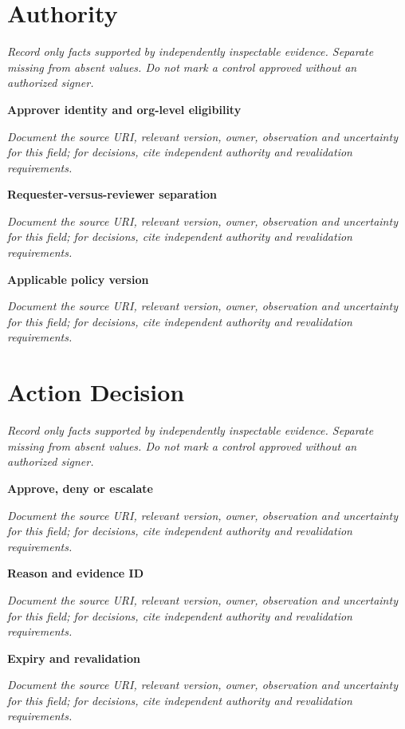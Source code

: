 \documentclass[11pt,letterpaper]{article}
\begin{document}
\section{Authority}
\noindent\emph{Record only facts supported by independently inspectable evidence. Separate missing from absent values. Do not mark a control approved without an authorized signer.}\par
\noindent\textbf{Approver identity and org-level eligibility}\par
\noindent\emph{Document the source URI, relevant version, owner, observation and uncertainty for this field; for decisions, cite independent authority and revalidation requirements.}\par\medskip
\noindent\textbf{Requester-versus-reviewer separation}\par
\noindent\emph{Document the source URI, relevant version, owner, observation and uncertainty for this field; for decisions, cite independent authority and revalidation requirements.}\par\medskip
\noindent\textbf{Applicable policy version}\par
\noindent\emph{Document the source URI, relevant version, owner, observation and uncertainty for this field; for decisions, cite independent authority and revalidation requirements.}\par\medskip
\section{Action Decision}
\noindent\emph{Record only facts supported by independently inspectable evidence. Separate missing from absent values. Do not mark a control approved without an authorized signer.}\par
\noindent\textbf{Approve, deny or escalate}\par
\noindent\emph{Document the source URI, relevant version, owner, observation and uncertainty for this field; for decisions, cite independent authority and revalidation requirements.}\par\medskip
\noindent\textbf{Reason and evidence ID}\par
\noindent\emph{Document the source URI, relevant version, owner, observation and uncertainty for this field; for decisions, cite independent authority and revalidation requirements.}\par\medskip
\noindent\textbf{Expiry and revalidation}\par
\noindent\emph{Document the source URI, relevant version, owner, observation and uncertainty for this field; for decisions, cite independent authority and revalidation requirements.}\par\medskip
\end{document}
